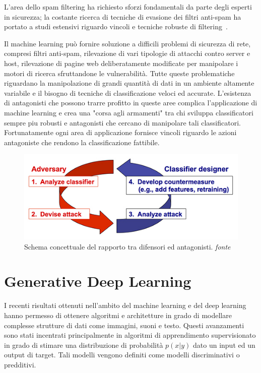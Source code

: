 L'area dello spam filtering ha richiesto sforzi fondamentali da parte degli esperti in sicurezza; la costante ricerca di tecniche di evasione dei filtri anti-spam ha portato a studi estensivi riguardo vincoli e tecniche robuste di filtering~\cite{dalvi}. 

Il machine learning può fornire soluzione a difficili problemi di sicurezza di rete, compresi filtri anti-spam, rilevazione di vari tipologie di attacchi contro server e host, rilevazione di pagine web 
deliberatamente modificate per manipolare i motori di ricerca sfruttandone le vulnerabilità. Tutte queste problematiche riguardano la manipolazione di grandi quantità di dati in un ambiente altamente variabile e il bisogno di tecniche di classificazione veloci ed accurate. L'esistenza di antagonisti che possono trarre profitto in queste aree complica l'applicazione di machine learning e crea una "corsa agli armamenti" tra chi sviluppa classificatori sempre piu robusti e antagonisti che cercano di manipolare tali classificatori. Fortunatamente ogni area di applicazione fornisce vincoli riguardo le azioni antagoniste che rendono la classificazione fattibile. 

\begin{figure}[!htbp]
	\centering
	\includegraphics[width=\columnwidth]{figures/Reactive_arms_race.jpg}
	\caption{Schema concettuale del rapporto tra difensori ed antagonisti. \textit{fonte}%
	~\cite{wiki:Adversarial_machine_learning} \label{fig:advarms} }
\end{figure}

\newpage
\section{Generative Deep Learning}
I recenti risultati ottenuti nell'ambito del machine learning e del deep learning hanno permesso di ottenere algoritmi e architetture in grado di modellare complesse strutture di dati come immagini, suoni e testo. Questi avanzamenti sono stati incentrati principalmente in algoritmi di apprendimento supervisionato in grado di stimare una distribuzione di probabilità $p(x|y)$ dato un input ed un output di target. Tali modelli vengono definiti come modelli discriminativi o predditivi.

